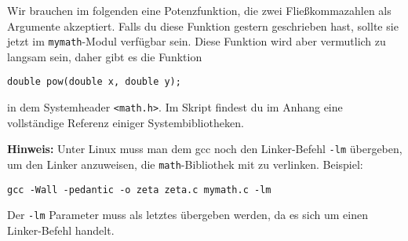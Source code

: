 \documentclass{uebungszettel}
\begin{document}


Wir brauchen im folgenden eine Potenzfunktion, die zwei Fließkommazahlen als
Argumente akzeptiert. Falls du diese Funktion gestern geschrieben hast, sollte
sie jetzt im \verb|mymath|-Modul verfügbar sein. Diese Funktion wird aber
vermutlich zu langsam sein, daher gibt es die Funktion
\begin{verbatim}
double pow(double x, double y);
\end{verbatim}
in dem Systemheader \verb|<math.h>|. Im Skript findest du im Anhang eine
vollständige Referenz einiger Systembibliotheken.

\medskip \textbf{Hinweis:} Unter Linux muss man dem gcc noch den Linker-Befehl \verb|-lm| übergeben, um den Linker anzuweisen, die \verb|math|-Bibliothek mit zu verlinken. Beispiel:
\begin{center}
\verb|gcc -Wall -pedantic -o zeta zeta.c mymath.c -lm|
\end{center}
Der \verb|-lm| Parameter muss als letztes übergeben werden, da es sich um einen Linker-Befehl handelt.




\end{document}
